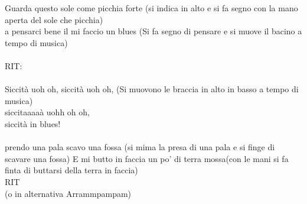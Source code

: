 \documentclass[../main.tex]{subfiles}
\begin{document}
        Guarda questo sole come picchia forte (si indica in alto e si fa segno con la mano aperta del sole che picchia)\\
        a pensarci bene il mi faccio un blues (Si fa segno di pensare e si muove il bacino a tempo di musica)\\
        \\
        RIT:\\
        \\
        Siccità uoh oh, siccità uoh oh, (Si muovono le braccia in alto in basso a tempo di musica)\\
        siccitaaaaà uohh oh oh,\\
        siccità in blues!\\
        \\
        prendo una pala scavo una fossa (si mima la presa di una pala e si finge di scavare una fossa)
        E mi butto in faccia un po' di terra mossa(con le mani si fa finta di buttarsi della terra in faccia)
        \\
        RIT\\ 
        (o in alternativa Arrammpampam)
   
\end{document}
